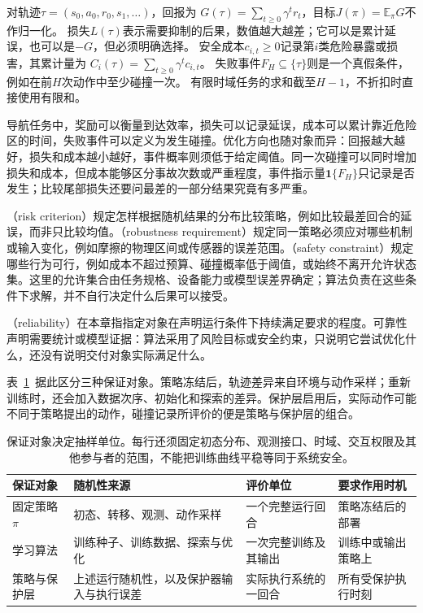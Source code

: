 \begin{definition}[回报、损失、成本与失败事件]
  \label{def:rl-trustworthy-objects}
  对轨迹$\tau=(s_0,a_0,r_0,s_1,\ldots)$，回报为
  $G(\tau)=\sum_{t\geq0}\gamma^t r_t$，目标$J(\pi)=\mathbb E_\pi G$不作归一化。
  损失$L(\tau)$表示需要抑制的后果，数值越大越差；它可以是累计延误，也可以是$-G$，但必须明确选择。
  安全成本$c_{i,t}\geq0$记录第$i$类危险暴露或损害，其累计量为
  $C_i(\tau)=\sum_{t\geq0}\gamma^t c_{i,t}$。
  失败事件$F_H\subseteq\{\tau\}$则是一个真假条件，例如在前$H$次动作中至少碰撞一次。
  有限时域任务的求和截至$H-1$，不折扣时直接使用有限和。
\end{definition}

导航任务中，奖励可以衡量到达效率，损失可以记录延误，成本可以累计靠近危险区的时间，失败事件可以定义为发生碰撞。优化方向也随对象而异：回报越大越好，损失和成本越小越好，事件概率则须低于给定阈值。同一次碰撞可以同时增加损失和成本，但成本能够区分事故次数或严重程度，事件指示量$\mathbf 1\{F_H\}$只记录是否发生；比较尾部损失还要问最差的一部分结果究竟有多严重。

（risk criterion）规定怎样根据随机结果的分布比较策略，例如比较最差回合的延误，而非只比较均值。（robustness requirement）规定同一策略必须应对哪些机制或输入变化，例如摩擦的物理区间或传感器的误差范围。（safety constraint）规定哪些行为可行，例如成本不超过预算、碰撞概率低于阈值，或始终不离开允许状态集。这里的允许集合由任务规格、设备能力或模型误差界确定；算法负责在这些条件下求解，并不自行决定什么后果可以接受。

（reliability）在本章指指定对象在声明运行条件下持续满足要求的程度。可靠性声明需要统计或模型证据：算法采用了风险目标或安全约束，只说明它尝试优化什么，还没有说明交付对象实际满足什么。

表~\ref{tab:rl-trustworthy-guarantee-objects}~据此区分三种保证对象。策略冻结后，轨迹差异来自环境与动作采样；重新训练时，还会加入数据次序、初始化和探索的差异。保护层启用后，实际动作可能不同于策略提出的动作，碰撞记录所评价的便是策略与保护层的组合。

\begin{table}[htbp]
  \centering
  \begin{tabularx}{\linewidth}{@{}>{\raggedright\arraybackslash}p{20mm}XXX@{}}
    \toprule
    保证对象 & 随机性来源 & 评价单位 & 要求作用时机 \\
    \midrule
    固定策略$\pi$ & 初态、转移、观测、动作采样 & 一个完整运行回合 & 策略冻结后的部署 \\
    学习算法 & 训练种子、训练数据、探索与优化 & 一次完整训练及其输出 & 训练中或输出策略上 \\
    策略与保护层 & 上述运行随机性，以及保护器输入与执行误差 & 实际执行系统的一回合 & 所有受保护执行时刻 \\
    \bottomrule
  \end{tabularx}
  \caption{保证对象决定抽样单位。每行还须固定初态分布、观测接口、时域、交互权限及其他参与者的范围，不能把训练曲线平稳等同于系统安全。}
  \label{tab:rl-trustworthy-guarantee-objects}
\end{table}

